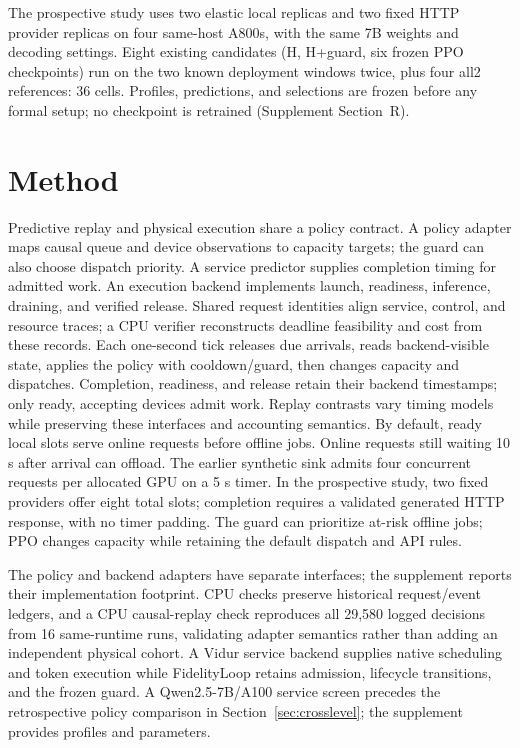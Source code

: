 The prospective study uses two elastic local replicas and two fixed HTTP
provider replicas on four same-host A800s, with the same 7B weights and
decoding settings. Eight existing candidates (H, H+guard, six frozen PPO
checkpoints) run on the two known deployment windows twice, plus four all2
references: 36 cells. Profiles, predictions, and selections are frozen before
any formal setup; no checkpoint is retrained (Supplement Section~R).

\section{Method}
Predictive replay and physical execution share a policy contract.
A policy adapter maps causal queue and device observations to capacity targets;
the guard can also choose dispatch priority. A service predictor supplies
completion timing for admitted work. An execution backend implements launch,
readiness, inference, draining, and verified release. Shared request identities
align service, control, and resource traces; a CPU verifier reconstructs deadline
feasibility and cost from these records. Each one-second tick releases due arrivals, reads backend-visible state,
applies the policy with cooldown/guard, then changes capacity and dispatches.
Completion, readiness, and release retain their backend timestamps; only
ready, accepting devices admit work. Replay contrasts vary timing models
while preserving these interfaces and accounting semantics.
By default, ready local slots serve online requests before offline jobs.
Online requests still waiting 10 s after arrival can offload. The earlier
synthetic sink admits four concurrent requests per allocated GPU on a 5 s
timer. In the prospective study, two fixed providers offer eight total slots;
completion requires a validated generated HTTP response, with no timer padding. The guard can prioritize at-risk offline jobs; PPO changes capacity
while retaining the default dispatch and API rules.

The policy and backend adapters have separate interfaces; the supplement
reports their implementation footprint. CPU checks preserve historical
request/event ledgers, and a CPU causal-replay check reproduces all 29,580 logged decisions from
16 same-runtime runs, validating adapter semantics rather than adding an
independent physical cohort. A Vidur service backend
\citep{vidur2024} supplies native scheduling and token execution while
FidelityLoop retains admission, lifecycle transitions, and the frozen guard.
A Qwen2.5-7B/A100 service screen precedes the retrospective policy comparison
in Section~\ref{sec:crosslevel}; the supplement provides profiles and parameters.

